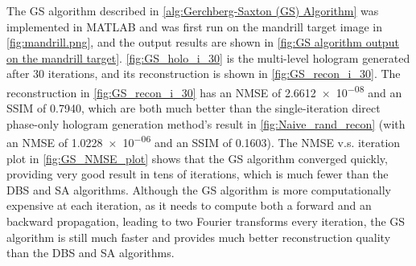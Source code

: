 The GS algorithm described in \cref{alg:Gerchberg-Saxton (GS) Algorithm} was implemented in MATLAB and was first run on the mandrill target image in \cref{fig:mandrill.png}, and the output results are shown in \cref{fig:GS algorithm output on the mandrill target}. \cref{fig:GS_holo_i_30} is the multi-level hologram generated after 30 iterations, and its reconstruction is shown in \cref{fig:GS_recon_i_30}. The reconstruction in \cref{fig:GS_recon_i_30} has an NMSE of \num{2.6612e-08} and an SSIM of 0.7940, which are both much better than the single-iteration direct phase-only hologram generation method's result in \cref{fig:Naive_rand_recon} (with an NMSE of \num{1.0228e-06} and an SSIM of 0.1603). The NMSE v.s. iteration plot in \cref{fig:GS_NMSE_plot} shows that the GS algorithm converged quickly, providing very good result in tens of iterations, which is much fewer than the DBS and SA algorithms. Although the GS algorithm is more computationally expensive at each iteration, as it needs to compute both a forward and an backward propagation, leading to two Fourier transforms every iteration, the GS algorithm is still much faster and provides much better reconstruction quality than the DBS and SA algorithms.


